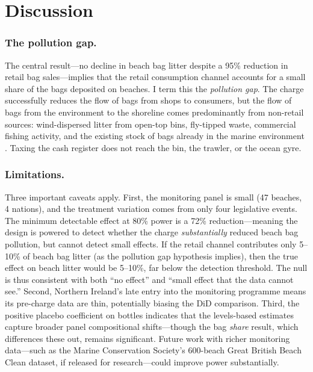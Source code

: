 \documentclass[12pt]{article}
\begin{document}


\section{Discussion}

\subsubsection*{The pollution gap.} The central result---no decline in beach bag litter despite a 95\% reduction in retail bag sales---implies that the retail consumption channel accounts for a small share of the bags deposited on beaches. I term this the \textit{pollution gap}. The charge successfully reduces the flow of bags from shops to consumers, but the flow of bags from the environment to the shoreline comes predominantly from non-retail sources: wind-dispersed litter from open-top bins, fly-tipped waste, commercial fishing activity, and the existing stock of bags already in the marine environment \citep{ospar_commission_beach_2020}. Taxing the cash register does not reach the bin, the trawler, or the ocean gyre.

\subsubsection*{Limitations.} Three important caveats apply. First, the monitoring panel is small (47 beaches, 4 nations), and the treatment variation comes from only four legislative events. The minimum detectable effect at 80\% power is a 72\% reduction---meaning the design is powered to detect whether the charge \textit{substantially} reduced beach bag pollution, but cannot detect small effects. If the retail channel contributes only 5--10\% of beach bag litter (as the pollution gap hypothesis implies), then the true effect on beach litter would be 5--10\%, far below the detection threshold. The null is thus consistent with both ``no effect'' and ``small effect that the data cannot see.'' Second, Northern Ireland's late entry into the monitoring programme means its pre-charge data are thin, potentially biasing the DiD comparison. Third, the positive placebo coefficient on bottles indicates that the levels-based estimates capture broader panel compositional shifts---though the bag \textit{share} result, which differences these out, remains significant. Future work with richer monitoring data---such as the Marine Conservation Society's 600-beach Great British Beach Clean dataset, if released for research---could improve power substantially.
\end{document}
